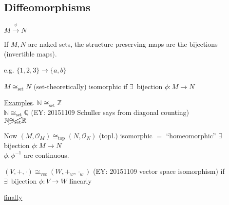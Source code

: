 \subsection{Diffeomorphisms}

$M \xrightarrow{ \phi } N$

If $M,N$ are naked sets, the structure preserving maps are the bijections (invertible maps).  

e.g. $\lbrace 1,2,3 \rbrace \to \lbrace a,b \rbrace$

\begin{definition}
  $M \cong_{\text{set}} N$ (set-theoretically) isomorphic if $\exists \, $ bijection $\phi : M \to N$
\end{definition}

\underline{Examples}.  $\mathbb{N} \cong_{\text{set}} \mathbb{Z}$ \\
$\mathbb{N} \cong_{\text{set}} \mathbb{Q}$  (EY: 20151109 Schuller says from diagonal counting)\\
$\mathbb{N} \cancel{\cong_{\text{set}}} \mathbb{R}$

Now $(M, \mathcal{O}_M) \cong_{\text{top}} (N,\mathcal{O}_N)$ (topl.) isomorphic $=$ ``homeomorphic'' $\exists \, $ bijection $\phi : M \to N$  \\
\phantom{ \quad \quad \, } $\phi, \phi^{-1}$ are continuous.  

$(V,+,\cdot) \cong_{\text{vec}} ( W,+_w,\cdot_w)$ (EY: 20151109 vector space isomorphism) if \\
$\exists \, \text{ bijection } \phi : V \to W$ linearly

\underline{finally}

